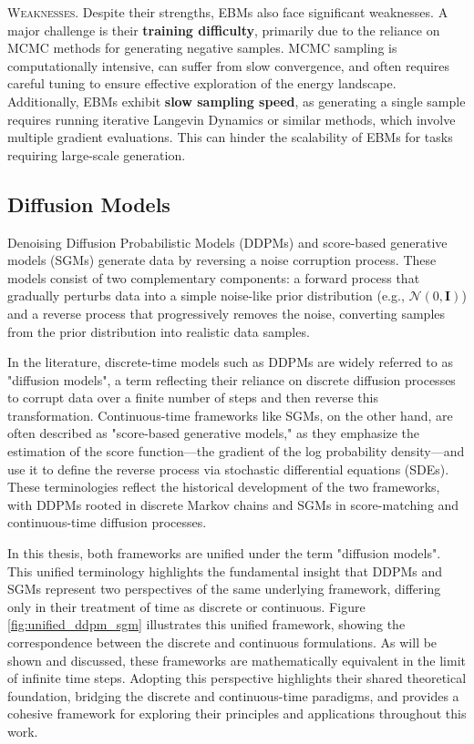 \textsc{Weaknesses.} Despite their strengths, EBMs also face significant weaknesses. A major challenge is their \textbf{training difficulty}, primarily due to the reliance on MCMC methods for generating negative samples. MCMC sampling is computationally intensive, can suffer from slow convergence, and often requires careful tuning to ensure effective exploration of the energy landscape. Additionally, EBMs exhibit \textbf{slow sampling speed}, as generating a single sample requires running iterative Langevin Dynamics or similar methods, which involve multiple gradient evaluations. This can hinder the scalability of EBMs for tasks requiring large-scale generation.


\subsection{Diffusion Models}

Denoising Diffusion Probabilistic Models (DDPMs) \cite{ho2020denoising} and score-based generative models (SGMs) \cite{song2021sde} generate data by reversing a noise corruption process. These models consist of two complementary components: a forward process that gradually perturbs data into a simple noise-like prior distribution (e.g., \( \mathcal{N}(0, \mathbf{I}) \)) and a reverse process that progressively removes the noise, converting samples from the prior distribution into realistic data samples.

In the literature, discrete-time models such as DDPMs are widely referred to as "diffusion models", a term reflecting their reliance on discrete diffusion processes to corrupt data over a finite number of steps and then reverse this transformation. Continuous-time frameworks like SGMs, on the other hand, are often described as "score-based generative models," as they emphasize the estimation of the score function—the gradient of the log probability density—and use it to define the reverse process via stochastic differential equations (SDEs). These terminologies reflect the historical development of the two frameworks, with DDPMs rooted in discrete Markov chains and SGMs in score-matching and continuous-time diffusion processes.

In this thesis, both frameworks are unified under the term "diffusion models". This unified terminology highlights the fundamental insight that DDPMs and SGMs represent two perspectives of the same underlying framework, differing only in their treatment of time as discrete or continuous. Figure \ref{fig:unified_ddpm_sgm} illustrates this unified framework, showing the correspondence between the discrete and continuous formulations. As will be shown and discussed, these frameworks are mathematically equivalent in the limit of infinite time steps. Adopting this perspective highlights their shared theoretical foundation, bridging the discrete and continuous-time paradigms, and provides a cohesive framework for exploring their principles and applications throughout this work.

